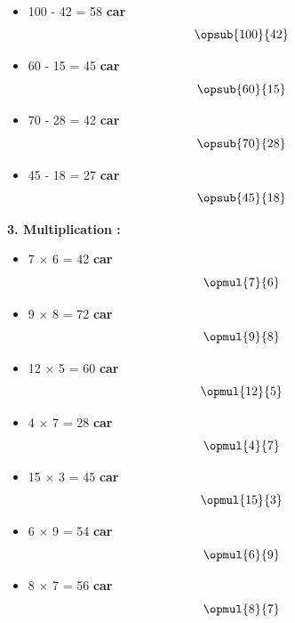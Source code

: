 \documentclass{article}
\begin{document}
\begin{tcolorbox}[colback=green!10!white, colframe=green!75!black, sharp corners=south, boxrule=0.8mm, title=Corrections]
    \begin{itemize}
        \item 100 - 42 = 58 \textbf{car}
        \[
        \opsub{100}{42}
        \]
        \item 60 - 15 = 45 \textbf{car}
        \[
        \opsub{60}{15}
        \]
        \item 70 - 28 = 42 \textbf{car}
        \[
        \opsub{70}{28}
        \]
        \item 45 - 18 = 27 \textbf{car}
        \[
        \opsub{45}{18}
        \]
    \end{itemize}

    \textbf{3. Multiplication :}
    \begin{itemize}
        \item 7 × 6 = 42 \textbf{car}
        \[
        \opmul{7}{6}
        \]
        \item 9 × 8 = 72 \textbf{car}
        \[
        \opmul{9}{8}
        \]
        \item 12 × 5 = 60 \textbf{car}
        \[
        \opmul{12}{5}
        \]
        \item 4 × 7 = 28 \textbf{car}
        \[
        \opmul{4}{7} 
        \]
        \item 15 × 3 = 45 \textbf{car}
        \[
        \opmul{15}{3}
        \]
        \item 6 × 9 = 54 \textbf{car}
        \[
        \opmul{6}{9} 
        \]
        \item 8 × 7 = 56 \textbf{car}
        \[
        \opmul{8}{7} 
        \]
    \end{itemize}
\end{tcolorbox}
\end{document}
